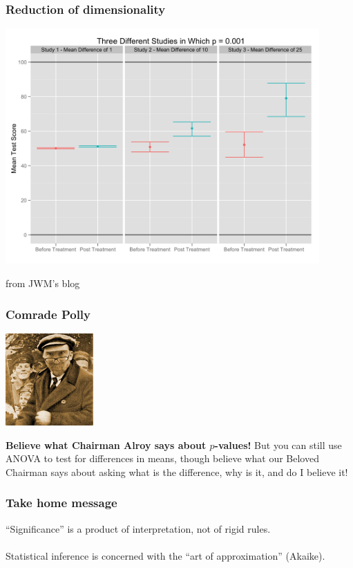 \documentclass{beamer}\usepackage{graphicx, color}
\begin{document}
\begin{frame}
\frametitle{Reduction of dimensionality}

\includegraphics[width = 0.9\textwidth, keepaspectratio = true]{three_studies1}

\footnotesize{from JWM's blog}
\end{frame}


\begin{frame}
\frametitle{Comrade Polly}

\begin{flushright}
\includegraphics[height = 100pt, keepaspectratio = true]{polly}
\end{flushright}

\textbf{Believe what Chairman Alroy says about \(p\)-values!}
But you can still use ANOVA to test for differences in means, though believe what our Beloved Chairman says about asking what is the difference, why is it, and do I believe it!
\end{frame}


\begin{frame}
\frametitle{Take home message}
\Large{``Significance'' is a product of interpretation, not of rigid rules.}
\\~\\
\Large{Statistical inference is concerned with the ``art of approximation''} \small{(Akaike)}.
\end{frame}
\end{document}
